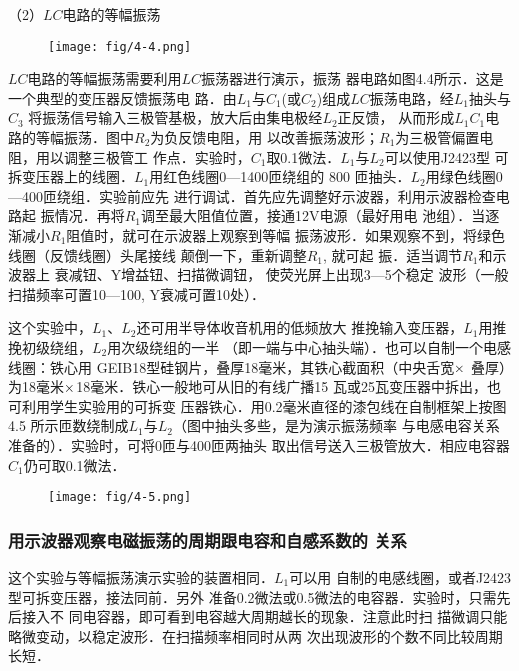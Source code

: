 （2）$LC$电路的等幅振荡

\begin{figure}[htp]
    \centering
\texttt{[image: fig/4-4.png]}
    \caption{}
\end{figure}

$LC$电路的等幅振荡需要利用$LC$振荡器进行演示，振荡
器电路如图4.4所示．这是一个典型的变压器反馈振荡电
路．由$L_1$与$C_1$(或$C_2$)组成$LC$振荡电路，经$L_1$抽头与$C_3$
将振荡信号输入三极管基极，放大后由集电极经$L_2$正反馈，
从而形成$L_1C_1$电路的等幅振荡．图中$R_2$为负反馈电阻，用
以改善振荡波形；$R_1$为三极管偏置电阻，用以调整三极管工
作点．实验时，$C_1$取0.1微法．$L_1$与$L_2$可以使用J2423型
可拆变压器上的线圈．$L_1$用红色线圈0—1400匝绕组的
800 匝抽头．$L_2$用绿色线圈0—400匝绕组．实验前应先
进行调试．首先应先调整好示波器，利用示波器检查电路起
振情况．再将$R_1$调至最大阻值位置，接通12V电源（最好用电
池组）．当逐渐减小$R_1$阻值时，就可在示波器上观察到等幅
振荡波形．如果观察不到，将绿色线圈（反馈线圈）头尾接线
颠倒一下，重新调整$R_1$, 就可起
振．适当调节$R_1$和示波器上
衰减钮、Y增益钮、扫描微调钮，
使荧光屏上出现3—5个稳定
波形（一般扫描频率可置10—100, Y衰减可置10处）．

这个实验中，$L_1$、$L_2$还可用半导体收音机用的低频放大
推挽输入变压器，$L_1$用推挽初级绕组，$L_2$用次级绕组的一半
（即一端与中心抽头端）．也可以自制一个电感线圈：铁心用
GEIB18型硅钢片，叠厚18毫米，其铁心截面积（中央舌宽$\times$
叠厚）为18毫米$\times$18毫米．铁心一般地可从旧的有线广播15
瓦或25瓦变压器中拆出，也可利用学生实验用的可拆变
压器铁心．用0.2毫米直径的漆包线在自制框架上按图4.5
所示匝数绕制成$L_1$与$L_2$（图中抽头多些，是为演示振荡频率
与电感电容关系准备的）．实验时，可将0匝与400匝两抽头
取出信号送入三极管放大．相应电容器$C_1$仍可取0.1微法．

\begin{figure}[htp]
    \centering
\texttt{[image: fig/4-5.png]}
    \caption{}
\end{figure}

\subsubsection{用示波器观察电磁振荡的周期跟电容和自感系数的
关系}

这个实验与等幅振荡演示实验的装置相同．$L_1$可以用
自制的电感线圈，或者J2423型可拆变压器，接法同前．另外
准备0.2微法或0.5微法的电容器．实验时，只需先后接入不
同电容器，即可看到电容越大周期越长的现象．注意此时扫
描微调只能略微变动，以稳定波形．在扫描频率相同时从两
次出现波形的个数不同比较周期长短．

